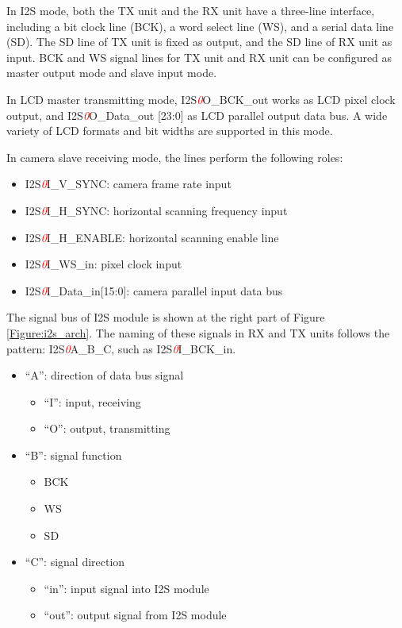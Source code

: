 \documentclass[main\_\_EN.tex]{subfiles}
\begin{document}
In I2S mode, both the TX unit and the RX unit have a three-line interface, including a bit clock line (BCK), a word select line (WS), and a serial data line (SD). The SD line of TX unit is fixed as output, and the SD line of RX unit as input. BCK and WS signal lines for TX unit and RX unit can be configured as master output mode and slave input mode.

In LCD master transmitting mode, I2S\textcolor{red}{\it{0}}O\_BCK\_out works as LCD pixel clock output, and I2S\textcolor{red}{\it{0}}O\_Data\_out [23:0] as LCD parallel output data bus. A wide variety of LCD formats and bit widths are supported in this mode.

In camera slave receiving mode, the lines perform the following roles:

\begin{itemize}
    \item I2S\textcolor{red}{\it{0}}I\_V\_SYNC: camera frame rate input
    \item I2S\textcolor{red}{\it{0}}I\_H\_SYNC: horizontal scanning frequency input
    \item I2S\textcolor{red}{\it{0}}I\_H\_ENABLE: horizontal scanning enable line
    \item I2S\textcolor{red}{\it{0}}I\_WS\_in: pixel clock input
    \item I2S\textcolor{red}{\it{0}}I\_Data\_in[15:0]: camera parallel input data bus
\end{itemize}

The signal bus of I2S module is shown at the right part of Figure \ref{Figure:i2s_arch}. The naming of these signals in RX and TX units follows the pattern: I2S\textcolor{red}{\it{0}}A\_B\_C, such as I2S\textcolor{red}{\it{0}}I\_BCK\_in.

\begin{itemize}
    \item ``A'': direction of data bus signal
        \begin{itemize}
            \item ``I'': input, receiving
            \item  ``O'': output, transmitting
        \end{itemize}
    \item ``B'': signal function
     \begin{itemize}
            \item BCK
            \item WS
            \item SD
        \end{itemize}
    \item ``C'': signal direction
        \begin{itemize}
            \item ``in'': input signal into I2S module
            \item ``out'': output signal from I2S module
        \end{itemize}
\end{itemize}
\end{document}
